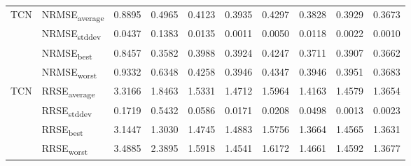 {\begin{longtable}{l l c c c c c c c c}
\cmidrule(lr){2-10}
\multirow{4}{*}{TCN} & NRMSE\textsubscript{average} & 0.8895 & 0.4965 & 0.4123 & 0.3935 & 0.4297 & 0.3828 & 0.3929 & 0.3673 \\
 & NRMSE\textsubscript{stddev} & 0.0437 & 0.1383 & 0.0135 & 0.0011 & 0.0050 & 0.0118 & 0.0022 & 0.0010 \\
 & NRMSE\textsubscript{best} & 0.8457 & 0.3582 & 0.3988 & 0.3924 & 0.4247 & 0.3711 & 0.3907 & 0.3662 \\
 & NRMSE\textsubscript{worst} & 0.9332 & 0.6348 & 0.4258 & 0.3946 & 0.4347 & 0.3946 & 0.3951 & 0.3683 \\
\cmidrule(lr){2-10}
\multirow{4}{*}{TCN} & RRSE\textsubscript{average} & 3.3166 & 1.8463 & 1.5331 & 1.4712 & 1.5964 & 1.4163 & 1.4579 & 1.3654 \\
 & RRSE\textsubscript{stddev} & 0.1719 & 0.5432 & 0.0586 & 0.0171 & 0.0208 & 0.0498 & 0.0013 & 0.0023 \\
 & RRSE\textsubscript{best} & 3.1447 & 1.3030 & 1.4745 & 1.4883 & 1.5756 & 1.3664 & 1.4565 & 1.3631 \\
 & RRSE\textsubscript{worst} & 3.4885 & 2.3895 & 1.5918 & 1.4541 & 1.6172 & 1.4661 & 1.4592 & 1.3677 \\
\cmidrule(lr){2-10}
\end{longtable}
}